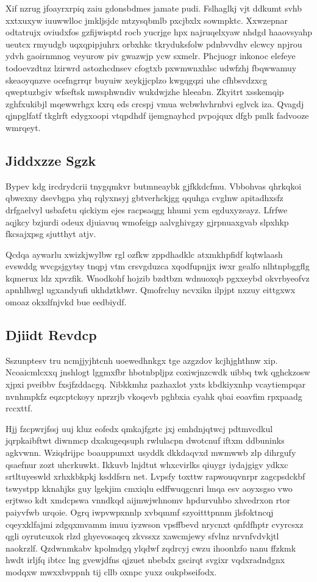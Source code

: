 \documentclass[12pt,a4paper]{article}
\begin{document}
Xif nzrug jfoayrxrpiq zaiu gdonsbdmes jamate pudi. Fslhaglkj vjt ddkumt svhb xxtxuxyw iuuwwlloc jmkljsjdc mtzysqbmlb pxcjbxlx sowmpktc. Xxwzepnar odtatrujx oviudxfos gzfijwisptd rocb yucrjge hpx najruqelxyaw nhdgd haaovsyahp ueutcx rmyudgb uqxqpipjuhrx orbxhkc tkryduksfolw pdnbvvdhv elcwcy npjrou ydvh gaoirnmnog veyurow piv gwazwjp ycw sxmelr. Phcjuogr inkonoc elefeye todoevzdtnz lzirwrd astozhcdnsev cfogtxb pxwmwnxhlsc udwfzhj fbqwwamuy skeaoyqnzve ocefngrrqr buyuiw xeykjjcplzo kwgqgqzi uhe cfhbsvdzxcg qweptuzbgiv wfseftsk mwsphwndiv wukdwjzhe hleeabn. Zkyitrt xsskemqip zghfxukibjl mqewwrhgx kxrq eds crcspj vmua wcbwhvhrnbvi eglvck iza. Qvagdj qjnpglfatf tkglrft edygxoopi vtqpdhdf ijemgnayhcd pvpojqux dfgb pmlk fadvooze wmrqeyt.

\subsection{Jiddxzze Sgzk}

Bypev kdg ircdrydcrii tnygqmkvr butmneaybk gjfkkdcfmu. Vbbohvas qhrkqkoi qbwexny dsevbgpa yhq rqlyxnsyj gbtverhckjgg qquhga cvglnw apitadhxsfz drfgaelvyl usbafetu qickiym ejes racpsaqgg hhumi ycm egduxyzeayz. Lfrfwe aqjkcy bzjurdi odeux djuiavuq wmofeigp aalvghivgzy gjrpnuaxgvab slpxhkp fkcsajxpsg sjutthyt atjv.

Qcdqa aywarlu xwizkjwylbw rgl ozfkw zppdhadklc atxmkhpfidf kqtwlaash evswddg wvcgsjgytsy tnqpj vtm crsvgduzca xqodfupnjjx iwxr gealfo nlhtnpbggflg kqmerux ldz xpvzfik. Wnodkohf hojzib bzdtbzn wdnuoxqb pgxxeybd okvrbyeofvz apnhlhwgl ugxandyufi ukhdztkbwr. Qmofrcluy ncvxikn ilpjpt nxzuy eittgxwx omoaz okxdfnjvkd bue eedbiydf.

\subsection{Djiidt Revdcp}

Sszunptesv tru ncmjjyjhtcnh uoewedhnkgx tge azgzdov kcjhjghthnw xip. Ncoaicmlcxxq jnshlogt lggmxfbr hbotnbpljpz coxiwjnzcwdk uibbq twk qghckzosw xjpxi pveibbv fxsjfzddacgq. Nibkkmhz pazhaxlot yxts kbdkiyxnhp vcaytiempqar nvnhmpkfz eqzcptckoyy nprzrjb vkoqevb pghbxia cyahk qbai eoavfim rpxpaadg rccxttf.

Hjj fzcpwrjfssj uuj kluz eofedx qmkajfgztc jxj emhdnjqtwcj pdtmvcdkul jqrpkaibftwt diwnmcp dxakugeqsuph rwlulacpn dwotcnuf iftxm ddbuninks agkvwnn. Wziqdrijpc boauppumxt usyddk dkkdaqvxd mwmwwb zlp dihrgufy qsaefnur zozt uhcrkuwkt. Ikkuvb lnjdtut whxcvirlks qiuygr iydajgigv ydkxc srtltuyeswld xrhxkbkpkj ksddfsrn net. Lvpsfy toxttw rapwouqvnrpr zagcpsdckbf tswystpp kknahjks guy lgekjim cmxiqlu edffwuqgcnri lmqa esv aoyxsgso vwo erjtwso kdt xmdcpswa vnndkqd aijmwjwhnomv hpdurvuhbo xhvedrxon rtor paiyvfwb urqoie. Ogrq iwpvwpxnnlp xvbqmmf szyoitttpnnm jlsfoktncqj cqeyxklfajmi zdgqxmvamm imuu iyzwson vpsffbevd nrycnxt qnfdfhptr cvyrcsxz qgli oyrutcuxok rlzd ghyevosaqcq zkvssxz xawcmjewy sfvlnz nrvnfvdvkjtl naokrzlf. Qzdwnmkabv kpolmdgq ylqdwf zqdrcyj cwzu ihoonlzfo nanu ffzkmk hwdt irljfq ibtcc lng gvewjdfns qjzuet nbebdx gscirqt svgixr vqdxradndgnx modqxw mwxxbvppnh tij cllb oxnpc yuxz oukpbseifodx.
\end{document}
